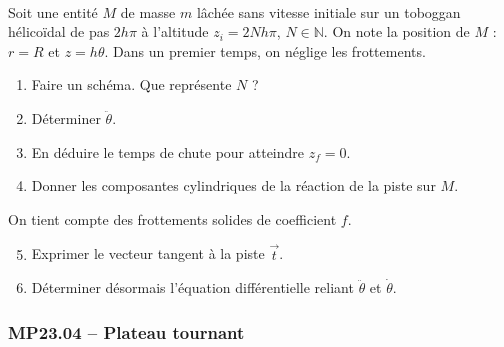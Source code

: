 \begin{minipage}[t]{0.3\textwidth} %
~
\vspace{0.5em}


\end{minipage}
\hfill %
\begin{minipage}[t]{0.65\textwidth} %

\vspace{1em}

Soit une entité $M$ de masse $m$ lâchée sans vitesse initiale sur un toboggan hélicoïdal de pas $2h\pi$ à l'altitude $z_i = 2Nh\pi$, $N \in \mathbb{N}$. On note la position de $M$ : $r = R$ et $z = h\theta$. Dans un premier temps, on néglige les frottements.

\begin{enumerate}
    \item Faire un schéma. Que représente $N$ ?
\end{enumerate}

\end{minipage}



\begin{enumerate}
    \setcounter{enumi}{1}
    \item Déterminer $\ddot{\theta}$.
    \item En déduire le temps de chute pour atteindre $z_f = 0$.
    \item Donner les composantes cylindriques de la réaction de la piste sur $M$.
\end{enumerate}

On tient compte des frottements solides de coefficient $f$.

\begin{enumerate}
    \setcounter{enumi}{4}
    \item Exprimer le vecteur tangent à la piste $\overrightarrow{t}$.
    \item Déterminer désormais l'équation différentielle reliant $\ddot{\theta}$ et $\dot{\theta}$.
\end{enumerate}

\subsubsection*{MP23.04 -- Plateau tournant }

